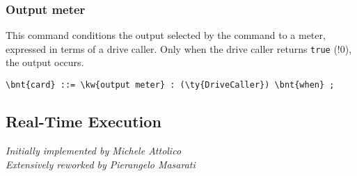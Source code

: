\subsubsection{Output meter}
This command conditions the output selected by the  command
to a meter, expressed in terms of a drive caller.
Only when the drive caller returns \texttt{true} (!0), the output occurs.
\begin{Verbatim}[commandchars=\\\{\}]
    \bnt{card} ::= \kw{output meter} : (\ty{DriveCaller}) \bnt{when} ;
\end{Verbatim}



\subsection{Real-Time Execution}\label{sec:REAL-TIME}
\emph{Initially implemented by Michele Attolico} \\
\emph{Extensively reworked by Pierangelo Masarati}


